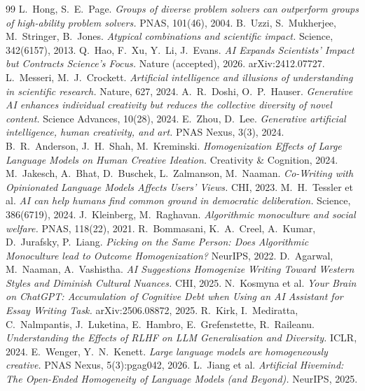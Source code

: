 \documentclass[11pt]{article}
\begin{document}
\begin{thebibliography}{99}
\small
{} L.\ Hong, S.\ E.\ Page. \emph{Groups of diverse problem solvers can outperform groups of high-ability problem solvers.} PNAS, 101(46), 2004.
 B.\ Uzzi, S.\ Mukherjee, M.\ Stringer, B.\ Jones. \emph{Atypical combinations and scientific impact.} Science, 342(6157), 2013.
 Q.\ Hao, F.\ Xu, Y.\ Li, J.\ Evans. \emph{AI Expands Scientists' Impact but Contracts Science's Focus.} Nature (accepted), 2026. arXiv:2412.07727.
 L.\ Messeri, M.\ J.\ Crockett. \emph{Artificial intelligence and illusions of understanding in scientific research.} Nature, 627, 2024.
 A.\ R.\ Doshi, O.\ P.\ Hauser. \emph{Generative AI enhances individual creativity but reduces the collective diversity of novel content.} Science Advances, 10(28), 2024.
 E.\ Zhou, D.\ Lee. \emph{Generative artificial intelligence, human creativity, and art.} PNAS Nexus, 3(3), 2024.
 B.\ R.\ Anderson, J.\ H.\ Shah, M.\ Kreminski. \emph{Homogenization Effects of Large Language Models on Human Creative Ideation.} Creativity \& Cognition, 2024.
 M.\ Jakesch, A.\ Bhat, D.\ Buschek, L.\ Zalmanson, M.\ Naaman. \emph{Co-Writing with Opinionated Language Models Affects Users' Views.} CHI, 2023.
 M.\ H.\ Tessler et al. \emph{AI can help humans find common ground in democratic deliberation.} Science, 386(6719), 2024.
 J.\ Kleinberg, M.\ Raghavan. \emph{Algorithmic monoculture and social welfare.} PNAS, 118(22), 2021.
 R.\ Bommasani, K.\ A.\ Creel, A.\ Kumar, D.\ Jurafsky, P.\ Liang. \emph{Picking on the Same Person: Does Algorithmic Monoculture lead to Outcome Homogenization?} NeurIPS, 2022.
 D.\ Agarwal, M.\ Naaman, A.\ Vashistha. \emph{AI Suggestions Homogenize Writing Toward Western Styles and Diminish Cultural Nuances.} CHI, 2025.
 N.\ Kosmyna et al. \emph{Your Brain on ChatGPT: Accumulation of Cognitive Debt when Using an AI Assistant for Essay Writing Task.} arXiv:2506.08872, 2025.
 R.\ Kirk, I.\ Mediratta, C.\ Nalmpantis, J.\ Luketina, E.\ Hambro, E.\ Grefenstette, R.\ Raileanu. \emph{Understanding the Effects of RLHF on LLM Generalisation and Diversity.} ICLR, 2024.
 E.\ Wenger, Y.\ N.\ Kenett. \emph{Large language models are homogeneously creative.} PNAS Nexus, 5(3):pgag042, 2026.
 L.\ Jiang et al. \emph{Artificial Hivemind: The Open-Ended Homogeneity of Language Models (and Beyond).} NeurIPS, 2025.

\end{thebibliography}
\end{document}
